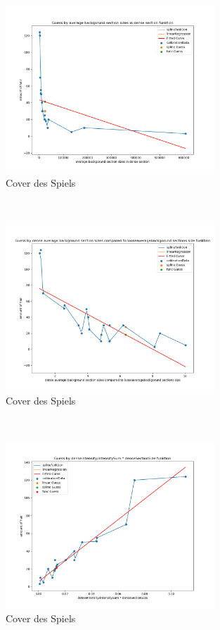 \documentclass[german,a4paper,12pt,smallheadings,headsepline, titlepage, liststotoc, idextotoc,bibtoctoc,blibliography = totocnumbered]{scrartcl}
\begin{document}
\begin{figure}
	\centering
	\includegraphics[width=0.7\textwidth]{figBina/g9.png}
	\caption[]{Cover des Spiels}
	\label{img:Bina01}
\end{figure}\\
\begin{figure}
	\centering
	\includegraphics[width=0.7\textwidth]{figBina/g10.png}
	\caption[]{Cover des Spiels}
	\label{img:Bina01}
\end{figure}\\
\begin{figure}
	\centering
	\includegraphics[width=0.7\textwidth]{figBina/g11.png}
	\caption[]{Cover des Spiels}
	\label{img:Bina01}
\end{figure}\\
\end{document}
